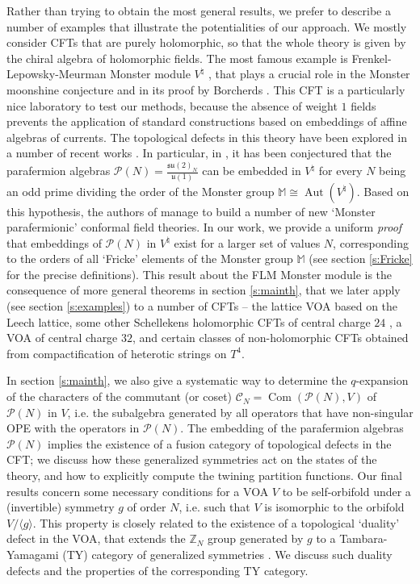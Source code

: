 \documentclass[11pt,reqno]{article}
\newcommand{\calC}{\mathcal{C}}
\DeclareMathOperator{\Aut}{Aut}
\DeclareMathOperator{\Com}{Com}
\newcommand{\ZZ}{\mathbb{Z}}
\newcommand{\paraf}{\mathcal{P}}
\newcommand{\alg}[1]{\mathfrak{#1}}
\begin{document}
Rather than trying to obtain the most general results, we prefer to describe a number of examples that illustrate the potentialities of our approach. We mostly consider CFTs that are purely holomorphic, so that the whole theory is given by the chiral algebra of holomorphic fields. The most famous example is Frenkel-Lepowsky-Meurman Monster module $V^\natural$ \cite{FLM1988}, that plays a crucial role in the Monster moonshine conjecture \cite{ConwayNorton1979} and in its proof by Borcherds \cite{Borcherds1992}. This CFT is a particularly nice laboratory to test our methods, because the absence of weight $1$ fields prevents the application of standard constructions based on embeddings of affine algebras of currents. The topological defects in this theory have been explored in a number of recent works \cite{Lin:2019hks,Bae:2020pvv,Fosbinder-Elkins:2024hff,Volpato:2024goy,Honda:2026bjy}. In particular, in \cite{Honda:2026bjy}, it has been conjectured that the parafermion algebras $\paraf(N)=\frac{\alg{su}(2)_N}{\alg{u}(1)}$ can be embedded in $V^\natural$ for every $N$ being an odd prime dividing the order of the Monster group $\mathbb{M}\cong \Aut(V^\natural)$. Based on this hypothesis, the authors of \cite{Honda:2026bjy} manage to build a number of new `Monster parafermionic' conformal field theories. In our work, we provide a uniform \emph{proof} that embeddings of $\paraf(N)$ in $V^\natural$ exist for a larger set of values $N$, corresponding to the orders of all `Fricke' elements of the Monster group $\mathbb{M}$ (see section \ref{s:Fricke} for the precise definitions). This result about the FLM Monster module is the consequence of more general theorems in section \ref{s:mainth}, that we later apply (see section \ref{s:examples}) to a number of CFTs -- the lattice VOA based on the Leech lattice, some other Schellekens holomorphic CFTs of central charge $24$ \cite{Schellekens1993}, a VOA of central charge $32$, and certain classes of non-holomorphic CFTs obtained from compactification of heterotic strings on $T^4$.

In section \ref{s:mainth}, we also give a systematic way to determine the $q$-expansion of the characters of the commutant (or coset) $\calC_N=\Com(\paraf(N),V)$ of  $\paraf(N)$ in $V$, i.e. the subalgebra generated by all operators that have non-singular OPE with the operators in $\paraf(N)$. The embedding of the parafermion algebras $\paraf(N)$ implies the existence of a fusion category of topological defects in the CFT; we discuss how these generalized symmetries act on the states of the theory, and how to explicitly compute the twining partition functions. Our final results concern some necessary conditions for a VOA $V$ to be self-orbifold under a (invertible) symmetry $g$ of order $N$, i.e. such that $V$ is isomorphic to the orbifold $V/\langle g\rangle$. This property is closely related to the existence of a topological `duality' defect in the VOA, that extends the $\ZZ_N$ group generated by $g$ to a Tambara-Yamagami (TY) category of generalized symmetries \cite{Tambara:1998}. We discuss such duality defects and the properties of the corresponding TY category.
\end{document}
